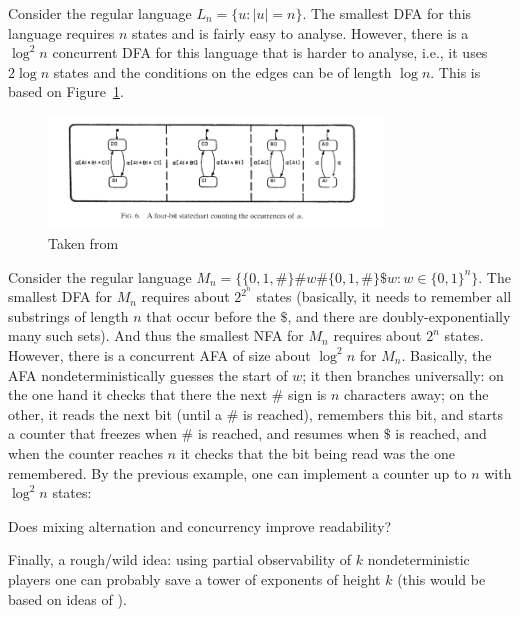 \documentclass[a4paper,10pt]{article}
\begin{document}
\begin{example}
Consider the regular language $L_n = \{u : |u| = n\}$. The smallest DFA for this language requires $n$ states and is fairly easy to analyse. 
However, there is a $\log^2 n$ concurrent DFA for this language that is harder to analyse, i.e., it uses $2\log n$ states and the conditions on the edges can be of length $\log n$. This is based on Figure~\ref{fig:counter}.
\end{example}

\begin{figure}
\centering
\includegraphics[height=3cm]{counter.png} 
\caption{Taken from \cite{DBLP:journals/jacm/DrusinskyH94}}
\label{fig:counter}
\end{figure}

\begin{example}
Consider the regular language $M_n = \{\{0,1,\#\}\#w\#\{0,1,\#\}\$w : w \in \{0,1\}^n\}$. 
The smallest DFA for $M_n$ requires about $2^{2^n}$ states (basically, it needs to remember all substrings of length $n$ that occur before the $\$$, and there are doubly-exponentially many such sets). And thus the smallest NFA for $M_n$ requires about $2^n$ states. However, there is a concurrent AFA of size about $\log^2 n$ for $M_n$. Basically, the AFA nondeterministically guesses the start of $w$; it then branches universally: on the one hand it checks that there the next $\#$ sign is $n$ characters away; on the other, it reads the next bit (until a $\#$ is reached), remembers this bit, and starts a counter that freezes when $\#$ is reached, and resumes when $\$$ is reached, and when the counter reaches $n$ it checks that the bit being read was the one remembered. By the previous example, one can implement a counter up to $n$ with $\log^2 n$ states: 
\end{example}

\begin{question}
 Does mixing alternation and concurrency improve readability?
\end{question}

Finally, a rough/wild idea: using partial observability of $k$ nondeterministic players one can probably save a tower of exponents of height $k$ (this would be based on ideas of \cite{DBLP:conf/focs/PetersonR79}).


\end{document}
